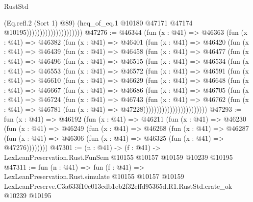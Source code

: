\begin{lexlean}{RustStd}
\begin{coremodule}
                                            (Eq.refl.{2} (Sort 1) @89)
                                            (heq_of_eq.{1}
                                              @10180
                                              @47171
                                              @47174
                                              @10195)))))))))))))))))))))
@47276 := @46344
    (fun (x : @41) =>
    @46363
      (fun (x : @41) =>
      @46382
        (fun (x : @41) =>
        @46401
          (fun (x : @41) =>
          @46420
            (fun (x : @41) =>
            @46439
              (fun (x : @41) =>
              @46458
                (fun (x : @41) =>
                @46477
                  (fun (x : @41) =>
                  @46496
                    (fun (x : @41) =>
                    @46515
                      (fun (x : @41) =>
                      @46534
                        (fun (x : @41) =>
                        @46553
                          (fun (x : @41) =>
                          @46572
                            (fun (x : @41) =>
                            @46591
                              (fun (x : @41) =>
                              @46610
                                (fun (x : @41) =>
                                @46629
                                  (fun (x : @41) =>
                                  @46648
                                    (fun (x : @41) =>
                                    @46667
                                      (fun (x : @41) =>
                                      @46686
                                        (fun (x : @41) =>
                                        @46705
                                          (fun (x : @41) =>
                                          @46724
                                            (fun (x : @41) =>
                                            @46743
                                              (fun (x : @41) =>
                                              @46762
                                                (fun (x : @41) =>
                                                @46781
                                                  (fun (x : @41) => @47228))))))))))))))))))))))))
@47293 := fun (x : @41) =>
  @46192
    (fun (x : @41) =>
    @46211
      (fun (x : @41) =>
      @46230
        (fun (x : @41) =>
        @46249
          (fun (x : @41) =>
          @46268
            (fun (x : @41) =>
            @46287
              (fun (x : @41) => @46306 (fun (x : @41) => @46325 (fun (x : @41) => @47276))))))))
@47301 := (n : @41) ->
  (f : @41) -> LexLeanPreservation.Rust.FunSem @10155 @10157 @10159 @10239 @10195
@47311 := fun (n : @41) =>
  fun (f : @41) =>
  LexLeanPreservation.Rust.simulate
    @10155
    @10157
    @10159
    LexLeanPreserve.C3a633f10c013cdb1eb2f32effd95365d.R1.RustStd.crate_ok
    @10239
    @10195
\end{coremodule}
\end{lexlean}
